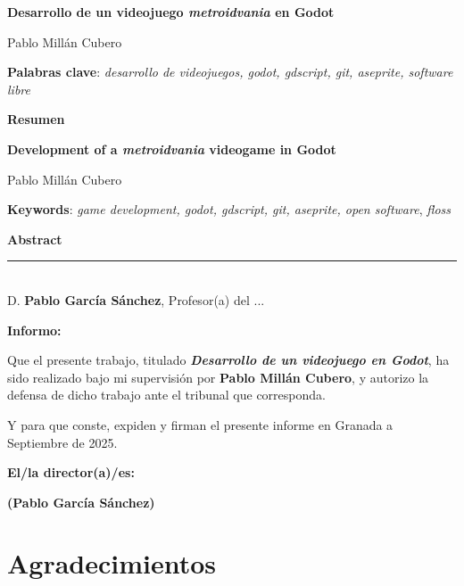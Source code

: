 \thispagestyle{empty}

\begin{center}
{\large\bfseries Desarrollo de un videojuego \textit{metroidvania} en Godot }\\
\end{center}
\begin{center}
Pablo Millán Cubero\\
\end{center}


\vspace{0.5cm}
\noindent\textbf{Palabras clave}: \textit{desarrollo de videojuegos, godot, gdscript, git, aseprite, software libre}
\vspace{0.7cm}

\noindent\textbf{Resumen}\\
	

\cleardoublepage

\begin{center}
	{\large\bfseries Development of a \textit{metroidvania} videogame in Godot}\\
\end{center}
\begin{center}
	Pablo Millán Cubero\\
\end{center}
\vspace{0.5cm}
\noindent\textbf{Keywords}: \textit{game development, godot, gdscript, git, aseprite, open software}, \textit{floss}
\vspace{0.7cm}

\noindent\textbf{Abstract}\\


\cleardoublepage

\thispagestyle{empty}

\noindent\rule[-1ex]{\textwidth}{2pt}\\[4.5ex]

D. \textbf{Pablo García Sánchez}, Profesor(a) del ...

\vspace{0.5cm}

\textbf{Informo:}

\vspace{0.5cm}

Que el presente trabajo, titulado \textit{\textbf{Desarrollo de un videojuego en Godot}},
ha sido realizado bajo mi supervisión por \textbf{Pablo Millán Cubero}, y autorizo la defensa de dicho trabajo ante el tribunal
que corresponda.

\vspace{0.5cm}

Y para que conste, expiden y firman el presente informe en Granada a Septiembre de 2025.

\vspace{1cm}

\textbf{El/la director(a)/es: }

\vspace{5cm}

\noindent \textbf{(Pablo García Sánchez)}

\chapter*{Agradecimientos}




